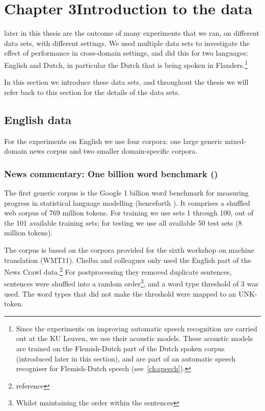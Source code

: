 \chapter{Chapter 3\newline Introduction to the data}\label{chap:data}
 later in this thesis are the outcome of many experiments that we ran, on different data sets, with different settings. We used multiple data sets to investigate the effect of performance in cross-domain settings, and did this for two languages: English and Dutch, in particular the Dutch that is being spoken in Flanders.\footnote{Since the experiments on improving automatic speech recognition are carried out at the KU Leuven, we use their acoustic models. These acoustic models are trained on the Flemish-Dutch part of the Dutch spoken corpus (introduced later in this section), and are part of an automatic speech recogniser for Flemish-Dutch speech (see~\cref{ch:speech}).} 

In this section we introduce these data sets, and throughout the thesis we will refer back to this section for the details of the data sets.

\section{English data}
For the experiments on English we use four corpora: one large generic mixed-domain news corpus and two smaller domain-specific corpora. %
  
  \subsection{News commentary: One billion word benchmark (\obw)}
  
  The first generic corpus is the Google 1 billion word benchmark for measuring progress in statistical language modelling (henceforth \obw). It comprises a shuffled web corpus of 769 million tokens.\autocite{chelba2013one} For training we use sets 1 through 100, out of the 101 available training sets; for testing we use all available 50 test sets (8 million tokens).
  
  The corpus is based on the corpora provided for the sixth workshop on machine translation (WMT11). Chelba and colleagues only used the English part of the News Crawl data.\footnote{reference} For postprocessing they removed duplicate sentences, sentences were shuffled into a random order\footnote{Whilst maintaining the order within the sentences}, and a word type threshold of 3 was used. The word types that did not make the threshold were mapped to an UNK-token.
  
